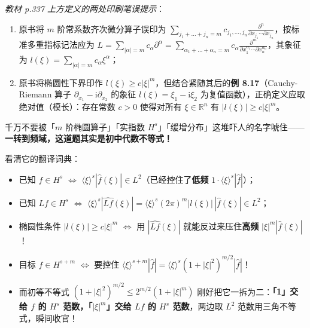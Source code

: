 \documentclass[11pt,a4paper]{article}
\providecommand{\tightlist}{\setlength{\itemsep}{2pt}\setlength{\parskip}{0pt}}
\newcommand{\SubPillAmber}[1]{%
  \Needspace{4.5\baselineskip}\vspace{5.5pt}\noindent
  \tcbox[on line, colback=AmberSoft, colframe=AmberMain!45!BorderColor, boxrule=0.45pt,
    arc=3.5pt, left=6pt, right=6pt, top=2pt, bottom=2pt]{\small\bfseries\color{AmberMain}#1}%
  \par\vspace{3pt}%
}
\renewenvironment{quote}{%
  \begin{tcolorbox}[
    enhanced,
    breakable,
    colback=AccentSoft!48!white,
    colframe=AccentMain,
    boxrule=0pt,
    leftrule=2.8pt,
    arc=2.5pt,
    left=9pt, right=8pt, top=6pt, bottom=6pt,
    before skip=5.5pt, after skip=5.5pt
  ]\small
}{%
  \end{tcolorbox}%
}
\begin{document}
\begin{quote}
\emph{教材 p.337 上方定义的两处印刷笔误提示}：

\begin{enumerate}
\def\labelenumi{\arabic{enumi}.}
\tightlist
\item
  原书将 \(m\) 阶常系数齐次微分算子误印为 \(\sum_{j_1+\dots+j_n=m} c_{j_1,\dots,j_n}\frac{\partial^n}{\partial x_{j_1}\cdots\partial x_{j_n}}\)，按标准多重指标记法应为 \(L = \sum_{|\alpha|=m} c_\alpha \partial^\alpha = \sum_{\alpha_1+\dots+\alpha_n=m} c_\alpha \frac{\partial^m}{\partial x_1^{\alpha_1}\cdots\partial x_n^{\alpha_n}}\)，其象征为 \(l(\xi) = \sum_{|\alpha|=m} c_\alpha \xi^\alpha\)；
\item
  原书将椭圆性下界印作 \(l(\xi) \ge c|\xi|^m\)，但结合紧随其后的\textbf{例 8.17}（Cauchy-Riemann 算子 \(\partial_{x_1} - \mathrm{i}\partial_{x_2}\) 的象征 \(l(\xi) = \xi_1 - \mathrm{i}\xi_2\) 为复值函数），正确定义应取绝对值（模长）：存在常数 \(c > 0\) 使得对所有 \(\xi \in \mathbb{R}^n\) 有 \(|l(\xi)| \ge c|\xi|^m\)。
\end{enumerate}
\end{quote}

\SubPillAmber{【零基础破题思路】}

千万不要被「\(m\) 阶椭圆算子」「实指数 \(H^s\)」「缓增分布」这堆吓人的名字唬住——\textbf{一转到频域，这道题其实是初中代数不等式！}

看清它的翻译词典：

\begin{itemize}
\tightlist
\item
  已知 \(f \in H^s\) \(\iff\) \(\langle\xi\rangle^s |\hat{f}(\xi)| \in L^2\)（已经控住了\textbf{低频} \(1 \cdot \langle\xi\rangle^s |\hat{f}|\)）；
\item
  已知 \(Lf \in H^s\) \(\iff\) \(\langle\xi\rangle^s |\widehat{Lf}(\xi)| = \langle\xi\rangle^s (2\pi)^m |l(\xi)|\,|\hat{f}(\xi)| \in L^2\)；
\item
  椭圆性条件 \(|l(\xi)| \ge c|\xi|^m\) \(\iff\) 用 \(|\widehat{Lf}(\xi)|\) 就能反过来压住\textbf{高频} \(|\xi|^m|\hat{f}(\xi)|\)！
\item
  目标 \(f \in H^{s+m}\) \(\iff\) 要控住 \(\langle\xi\rangle^{s+m}|\hat{f}| = \langle\xi\rangle^s (1 + |\xi|^2)^{m/2} |\hat{f}|\)！
\item
  而初等不等式 \((1 + |\xi|^2)^{m/2} \le 2^{m/2}(1 + |\xi|^m)\) 刚好把它一拆为二：\textbf{「1」交给 \(f\) 的 \(H^s\) 范数，「\(|\xi|^m\)」交给 \(Lf\) 的 \(H^s\) 范数}，两边取 \(L^2\) 范数用三角不等式，瞬间收官！
\end{itemize}
\end{document}

